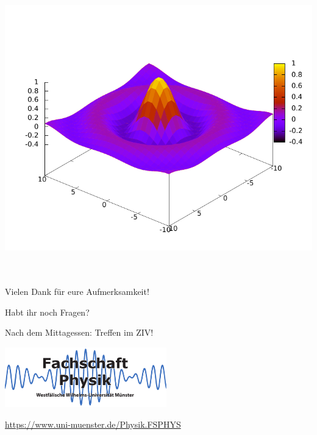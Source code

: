 \begin{frame}[<+->][fragile]
\begin{columns}
		\hspace*{-0.02\textwidth}
		\hspace*{-0.02\textwidth}
		\includegraphics[width=\textwidth]{res/gnuplot_pm3d.pdf}
	\end{columns}
\end{frame}

\section*{}
\subsection*{}

\begin{frame}
	\begin{block}{}
		\centering
		Vielen Dank für eure Aufmerksamkeit!
	\end{block}

	\begin{block}{}
		\centering
		Habt ihr noch Fragen?
	\end{block}
	
	\begin{block}{}
		\centering\LARGE
		Nach dem Mittagessen: Treffen im ZIV!
	\end{block}

	\begin{center}
		\includegraphics[width=7cm]{res/logo.pdf}
		
		\medskip
		\url{https://www.uni-muenster.de/Physik.FSPHYS}
	\end{center}
\end{frame}


